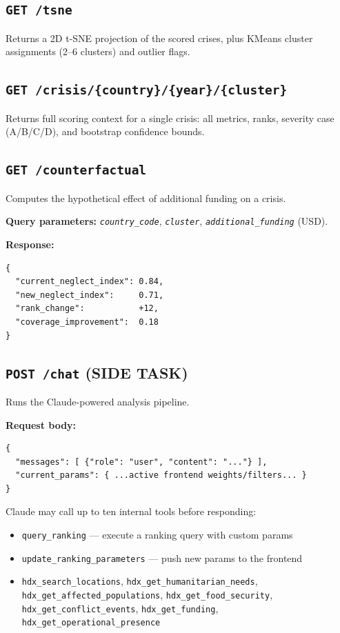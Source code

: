 \documentclass[11pt,a4paper]{article}
\newcommand{\code}[1]{\texttt{#1}}
\newcommand{\apiendpoint}[1]{\texttt{\textcolor{ocha-blue}{#1}}}
\newcommand{\param}[1]{\texttt{\textit{#1}}}
\begin{document}
\subsection{\apiendpoint{GET /tsne}}

Returns a 2D t-SNE projection of the scored crises, plus KMeans cluster assignments
(2--6 clusters) and outlier flags.

\subsection{\apiendpoint{GET /crisis/\{country\}/\{year\}/\{cluster\}}}

Returns full scoring context for a single crisis: all metrics, ranks, severity case
(A/B/C/D), and bootstrap confidence bounds.

\subsection{\apiendpoint{GET /counterfactual}}

Computes the hypothetical effect of additional funding on a crisis.

\textbf{Query parameters:} \param{country\_code}, \param{cluster},
\param{additional\_funding} (USD).

\textbf{Response:}
\begin{lstlisting}[language={}]
{
  "current_neglect_index": 0.84,
  "new_neglect_index":     0.71,
  "rank_change":           +12,
  "coverage_improvement":  0.18
}
\end{lstlisting}

\subsection{\apiendpoint{POST /chat} (SIDE TASK)}

Runs the Claude-powered analysis pipeline.

\textbf{Request body:}
\begin{lstlisting}[language={}]
{
  "messages": [ {"role": "user", "content": "..."} ],
  "current_params": { ...active frontend weights/filters... }
}
\end{lstlisting}

Claude may call up to ten internal tools before responding:
\begin{itemize}[nosep]
  \item \code{query\_ranking} --- execute a ranking query with custom params
  \item \code{update\_ranking\_parameters} --- push new params to the frontend
  \item \code{hdx\_search\_locations}, \code{hdx\_get\_humanitarian\_needs},
        \code{hdx\_get\_affected\_populations}, \code{hdx\_get\_food\_security},
        \code{hdx\_get\_conflict\_events}, \code{hdx\_get\_funding},
        \code{hdx\_get\_operational\_presence}
\end{itemize}
\end{document}
